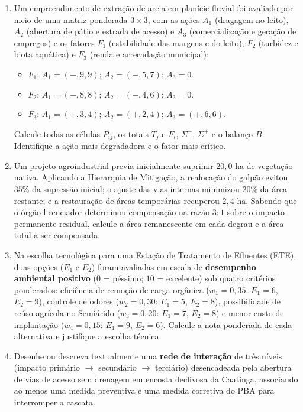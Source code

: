 \begin{enumerate}[leftmargin=1.8em, itemsep=4pt, resume]
  \item Um empreendimento de extração de areia em planície fluvial foi avaliado por meio de uma matriz ponderada $3 \times 3$, com as ações $A_1$ (dragagem no leito), $A_2$ (abertura de pátio e estrada de acesso) e $A_3$ (comercialização e geração de empregos) e os fatores $F_1$ (estabilidade das margens e do leito), $F_2$ (turbidez e biota aquática) e $F_3$ (renda e arrecadação municipal):
  \begin{itemize}[leftmargin=1.4em, itemsep=1pt]
    \item $F_1$: $A_1=(-, 9, 9)$; $A_2=(-, 5, 7)$; $A_3=0$.
    \item $F_2$: $A_1=(-, 8, 8)$; $A_2=(-, 4, 6)$; $A_3=0$.
    \item $F_3$: $A_1=(+, 3, 4)$; $A_2=(+, 2, 4)$; $A_3=(+, 6, 6)$.
  \end{itemize}
  Calcule todas as células $P_{ij}$, os totais $T_j$ e $F_i$, $\Sigma^{-}$, $\Sigma^{+}$ e o balanço $B$. Identifique a ação mais degradadora e o fator mais crítico.
  \espacoResolucao[3.2cm]

  \item Um projeto agroindustrial previa inicialmente suprimir $20{,}0\text{ ha}$ de vegetação nativa. Aplicando a Hierarquia de Mitigação, a realocação do galpão evitou $35\%$ da supressão inicial; o ajuste das vias internas minimizou $20\%$ da área restante; e a restauração de áreas temporárias recuperou $2{,}4\text{ ha}$. Sabendo que o órgão licenciador determinou compensação na razão $3{:}1$ sobre o impacto permanente residual, calcule a área remanescente em cada degrau e a área total a ser compensada.
  \espacoResolucao[2.8cm]

  \item Na escolha tecnológica para uma Estação de Tratamento de Efluentes (ETE), duas opções ($E_1$ e $E_2$) foram avaliadas em escala de \textbf{desempenho ambiental positivo} ($0$ = péssimo; $10$ = excelente) sob quatro critérios ponderados: eficiência de remoção de carga orgânica ($w_1 = 0{,}35$: $E_1=6$, $E_2=9$), controle de odores ($w_2 = 0{,}30$: $E_1=5$, $E_2=8$), possibilidade de reúso agrícola no Semiárido ($w_3 = 0{,}20$: $E_1=7$, $E_2=8$) e menor custo de implantação ($w_4 = 0{,}15$: $E_1=9$, $E_2=6$). Calcule a nota ponderada de cada alternativa e justifique a escolha técnica.
  \espacoResolucao[2.6cm]

  \item Desenhe ou descreva textualmente uma \textbf{rede de interação} de três níveis (impacto primário $\to$ secundário $\to$ terciário) desencadeada pela abertura de vias de acesso sem drenagem em encosta declivosa da Caatinga, associando ao menos uma medida preventiva e uma medida corretiva do PBA para interromper a cascata.
  \espacoResolucao[2.4cm]


\end{enumerate}
